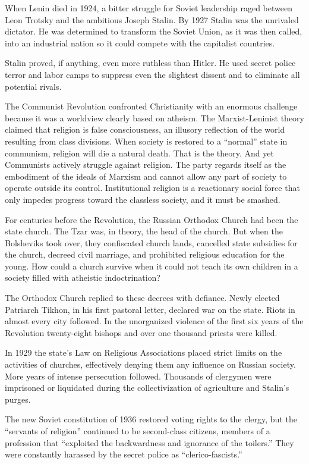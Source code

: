 When Lenin died in 1924, a bitter struggle for Soviet leadership raged between Leon Trotsky and the
ambitious Joseph Stalin. By 1927 Stalin was the unrivaled dictator. He was determined to transform
the Soviet Union, as it was then called, into an industrial nation so it could compete with the
capitalist countries.

Stalin proved, if anything, even more ruthless than Hitler. He used secret police terror and labor
camps to suppress even the slightest dissent and to eliminate all potential rivals.

The Communist Revolution confronted Christianity with an enormous challenge because it was a
worldview clearly based on atheism. The Marxist-Leninist theory claimed that religion is false
consciousness, an illusory reflection of the world resulting from class divisions. When society is
restored to a “normal” state in communism, religion will die a natural death. That is the theory.
And yet Communists actively struggle against religion. The party regards itself as the embodiment of
the ideals of Marxism and cannot allow any part of society to operate outside its control.
Institutional religion is a reactionary social force that only impedes progress toward the classless
society, and it must be smashed.

For centuries before the Revolution, the Russian Orthodox Church had been the state church. The Tzar
was, in theory, the head of the church. But when the Bolsheviks took over, they confiscated church
lands, cancelled state subsidies for the church, decreed civil marriage, and prohibited religious
education for the young. How could a church survive when it could not teach its own children in a
society filled with atheistic indoctrination?

The Orthodox Church replied to these decrees with defiance. Newly elected Patriarch Tikhon, in his
first pastoral letter, declared war on the state. Riots in almost every city followed. In the
unorganized violence of the first six years of the Revolution twenty-eight bishops and over one
thousand priests were killed.

In 1929 the state’s Law on Religious Associations placed strict limits on the activities of
churches, effectively denying them any influence on Russian society. More years of intense
persecution followed. Thousands of clergymen were imprisoned or liquidated during the
collectivization of agriculture and Stalin’s purges.

The new Soviet constitution of 1936 restored voting rights to the clergy, but the “servants of
religion” continued to be second-class citizens, members of a profession that “exploited the
backwardness and ignorance of the toilers.” They were constantly harassed by the secret police as
“clerico-fascists.”

